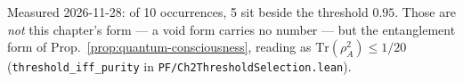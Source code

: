 \noindent Measured 2026-11-28: of 10 occurrences, 5 sit beside the threshold
$0.95$. Those are \emph{not} this chapter's form --- a void form carries no
number --- but the entanglement form of
Prop.~\ref{prop:quantum-consciousness}, reading as
$\mathrm{Tr}(\rho_A^2) \leq 1/20$ (\texttt{threshold\_iff\_purity} in
\texttt{PF/Ch2ThresholdSelection.lean}).


